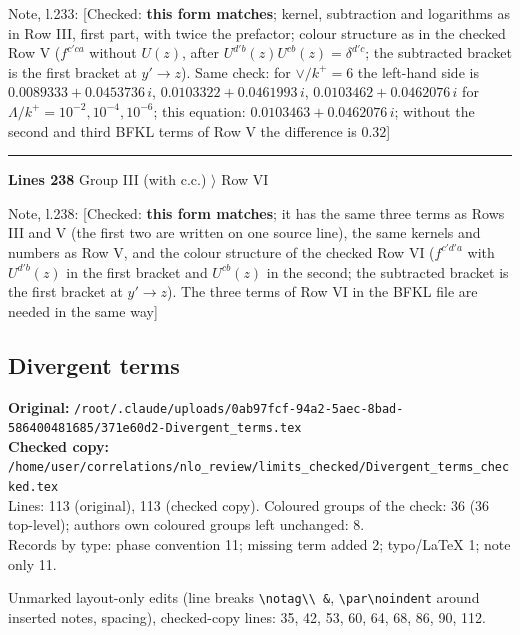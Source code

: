 \documentclass[10pt]{article}
\newenvironment{notebox}{\def\FrameCommand{{\color{notebar}\vrule width 1.5pt}\hspace{6pt}}\MakeFramed{\advance\hsize-\width\FrameRestore}\small}{\endMakeFramed}
\begin{document}
\begin{notebox}\textsf{\small Note, l.233:} [Checked: \textbf{this form matches}; kernel, subtraction and logarithms as in Row III, first part, with twice the prefactor; colour structure as in the checked Row V ($f^{c'ca}$ without $U(z)$, after $U^{d'b}(z)U^{cb}(z)=\delta^{d'c}$; the subtracted bracket is the first bracket at $y'\to z$). Same check: for $\vee/k^{+}=6$ the left-hand side is $0.0089333+0.0453736\,i$, $0.0103322+0.0461993\,i$, $0.0103462+0.0462076\,i$ for $\Lambda/k^{+}=10^{-2},10^{-4},10^{-6}$; this equation: $0.0103463+0.0462076\,i$; without the second and third BFKL terms of Row V the difference is $0.32$]\end{notebox}
\noindent\rule{\linewidth}{0.3pt}\par\noindent\textbf{Lines 238} \quad \textsf{Group III (with c.c.) $\rangle$ Row VI}\par
\begin{notebox}\textsf{\small Note, l.238:} [Checked: \textbf{this form matches}; it has the same three terms as Rows III and V (the first two are written on one source line), the same kernels and numbers as Row V, and the colour structure of the checked Row VI ($f^{c'd'a}$ with $U^{d'b}(z)$ in the first bracket and $U^{cb}(z)$ in the second; the subtracted bracket is the first bracket at $y'\to z$). The three terms of Row VI in the BFKL file are needed in the same way]\end{notebox}
\bigskip
\subsection{Divergent terms}\label{sec:file-divergent}
\noindent\textbf{Original:} \texttt{/root/.claude/uploads/0ab97fcf-94a2-5aec-8bad-586400481685/371e60d2-Divergent\_terms.tex}\\\textbf{Checked copy:} \texttt{/home/user/correlations/nlo\_review/limits\_checked/Divergent\_terms\_checked.tex}\\
Lines: 113 (original), 113 (checked copy). Coloured groups of the check: 36 (36 top-level); author\textquotesingle s own coloured groups left unchanged: 8.\\
Records by type: phase convention 11; missing term added 2; typo/LaTeX 1; note only 11.
\par\noindent Unmarked layout-only edits (line breaks \texttt{\textbackslash notag\textbackslash\textbackslash\ \&}, \texttt{\textbackslash par\textbackslash noindent} around inserted notes, spacing), checked-copy lines: 35, 42, 53, 60, 64, 68, 86, 90, 112.
\end{document}
